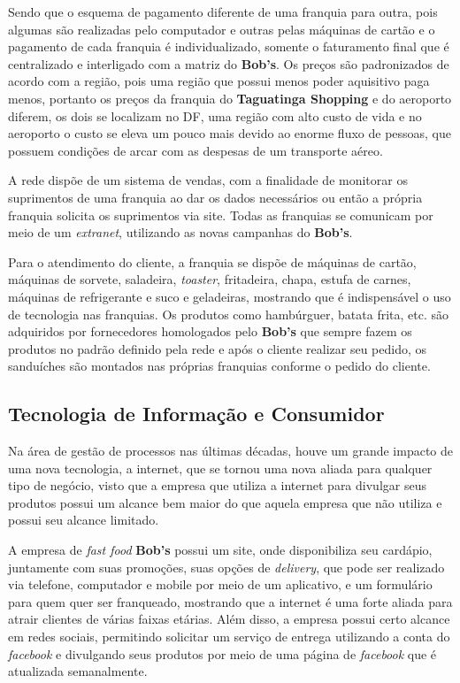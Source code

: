 		Sendo que o esquema de pagamento diferente de uma franquia para outra, pois algumas são realizadas pelo computador e outras pelas máquinas de cartão e o pagamento de cada franquia é individualizado, somente o faturamento final que é centralizado e interligado com a matriz do \textbf{Bob’s}. Os preços são padronizados de acordo com a região, pois uma região que possui menos poder aquisitivo paga menos, portanto os preços da franquia do \textbf{Taguatinga Shopping} e do aeroporto diferem, os dois se localizam no DF, uma região com alto custo de vida e no aeroporto o custo se eleva um pouco mais devido ao enorme fluxo de pessoas, que possuem condições de arcar com as despesas de um transporte aéreo.

		A rede dispõe de um sistema de vendas, com a finalidade de monitorar os suprimentos de uma franquia ao dar os dados necessários ou então a própria franquia solicita os suprimentos via site. Todas as franquias se comunicam por meio de um \emph{extranet}, utilizando as novas campanhas do \textbf{Bob’s}.

		Para o atendimento do cliente, a franquia se dispõe de máquinas de cartão, máquinas de sorvete, saladeira, \emph{toaster}, fritadeira, chapa, estufa de carnes, máquinas de refrigerante e suco e geladeiras, mostrando que é indispensável o uso de tecnologia nas franquias. Os produtos como hambúrguer, batata frita, etc. são adquiridos por fornecedores homologados pelo \textbf{Bob’s} que sempre fazem os produtos no padrão definido pela rede e após o cliente realizar seu pedido, os sanduíches são montados nas próprias franquias conforme o pedido do cliente.

		\subsection[Tecnologia de Informação e Consumidor]{Tecnologia de Informação e Consumidor}
		\label{sec:tecnologias_tic}

			Na área de gestão de processos nas últimas décadas, houve um grande impacto de uma nova tecnologia, a internet, que se tornou uma nova aliada para qualquer tipo de negócio, visto que a empresa que utiliza a internet para divulgar seus produtos possui um alcance bem maior do que aquela empresa que não utiliza e possui seu alcance limitado. \cite{slack}

			A empresa de \emph{fast food} \textbf{Bob’s} possui um site, onde disponibiliza seu cardápio, juntamente com suas promoções, suas opções de \emph{delivery}, que pode ser realizado via telefone, computador e mobile por meio de um aplicativo, e um formulário para quem quer ser franqueado, mostrando que a internet é uma forte aliada para atrair clientes de várias faixas etárias. Além disso, a empresa possui certo alcance em redes sociais, permitindo solicitar um serviço de entrega utilizando a conta do \emph{facebook} e divulgando seus produtos por meio de uma página de \emph{facebook} que é atualizada semanalmente.
		
